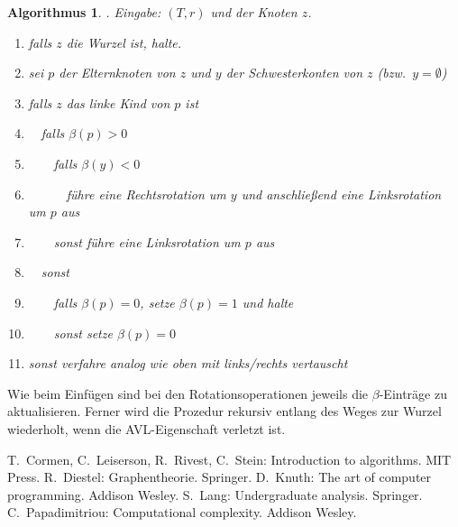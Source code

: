 \documentclass[10pt,reqno]{amsart}
\numberwithin{equation}{section}
\newtheorem{algorithm}[definition]{Algorithmus}
\begin{document}
\begin{algorithm}. {\em Eingabe:} $(T,r)$ und der Knoten $z$.
	\begin{enumerate}
		\item falls $z$ die Wurzel ist, halte.
		\item sei $p$ der Elternknoten von $z$ und $y$ der Schwesterkonten von $z$ (bzw.\ $y=\emptyset$)
		\item falls $z$ das linke Kind von $p$ ist
		\item $\quad$falls $\beta(p)>0$
		\item $\qquad$falls $\beta(y)<0$
		\item $\quad\qquad$f\"uhre eine Rechtsrotation um $y$ und anschlie\ss end eine Linksrotation um $p$ aus
		\item $\qquad$sonst f\"uhre eine Linksrotation um $p$ aus
		\item $\quad$sonst
		\item $\qquad$falls $\beta(p)=0$, setze $\beta(p)=1$ und halte
		\item $\qquad$sonst setze $\beta(p)=0$ %
		\item sonst verfahre analog wie oben mit links/rechts vertauscht
	\end{enumerate}
\end{algorithm}

Wie beim Einf\"ugen sind bei den Rotationsoperationen jeweils die $\beta$-Eintr\"age zu aktualisieren.
Ferner wird die Prozedur rekursiv entlang des Weges zur Wurzel wiederholt, wenn die AVL-Eigenschaft verletzt ist.


\begin{thebibliography}{99}
	T.~Cormen, C.~Leiserson, R.~Rivest, C.~Stein: Introduction to algorithms. MIT Press.
	R.~Diestel: Graphentheorie. Springer.
	D.~Knuth: The art of computer programming. Addison Wesley.
	S.~Lang: Undergraduate analysis. Springer.
	C.~Papadimitriou: Computational complexity. Addison Wesley.
\end{thebibliography}
\end{document}
